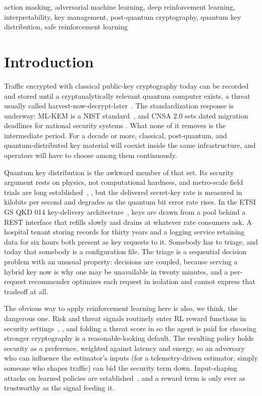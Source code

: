 \documentclass[conference]{IEEEtran}
\begin{document}
\begin{IEEEkeywords}
action masking, adversarial machine learning,
deep reinforcement learning, interpretability, key management,
post-quantum cryptography, quantum key distribution, safe reinforcement learning
\end{IEEEkeywords}

\section{Introduction}

Traffic encrypted with classical public-key cryptography
today can be recorded and stored until a cryptanalytically
relevant quantum computer exists, a threat usually called
harvest-now-decrypt-later~\cite{ref1}. The standardization response is
underway: ML-KEM is a NIST standard~\cite{ref2}, and CNSA 2.0
sets dated migration deadlines for national security systems
\cite{ref3}. What none of it removes is the intermediate period.
For a decade or more, classical, post-quantum, and quantum-distributed key material will coexist inside the same infrastructure, and operators will have to choose among them
continuously.

Quantum key distribution is the awkward member of that
set. Its security argument rests on physics, not computational
hardness, and metro-scale field trials are long established~\cite{ref4},
\cite{ref5}, but the delivered secret-key rate is measured in kilobits
per second and degrades as the quantum bit error rate rises. In
the ETSI GS QKD 014 key-delivery architecture~\cite{ref6}, keys are
drawn from a pool behind a REST interface that refills slowly
and drains at whatever rate consumers ask. A hospital tenant
storing records for thirty years and a logging service retaining
data for six hours both present as key requests to it. Somebody
has to triage, and today that somebody is a configuration file.
The triage is a sequential decision problem with an unusual
property: decisions are coupled, because serving a hybrid key
now is why one may be unavailable in twenty minutes, and a
per-request recommender optimizes each request in isolation
and cannot express that tradeoff at all.

The obvious way to apply reinforcement learning here is
also, we think, the dangerous one. Risk and threat signals
routinely enter RL reward functions in security settings~\cite{ref7},
\cite{ref8}, and folding a threat score in so the agent is paid for choosing stronger cryptography is a reasonable-looking default.
The resulting policy holds security as a preference, weighted
against latency and energy, so an adversary who can influence
the estimator's inputs (for a telemetry-driven estimator, simply
someone who shapes traffic) can bid the security term down.
Input-shaping attacks on learned policies are established~\cite{ref9},
and a reward term is only ever as trustworthy as the signal
feeding it.
\end{document}
